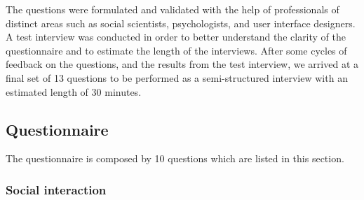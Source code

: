 \documentclass{sigchi}
\begin{document}
The questions were formulated and validated with the help of professionals of distinct areas such as social scientists, psychologists, and user interface designers.  A test interview was conducted in order to better understand the clarity of the questionnaire and to estimate the length of the interviews. After some cycles of feedback on the questions, and the results from the test interview, we arrived at a final set of 13 questions to be performed as a semi-structured interview with an estimated length of 30 minutes. 

\subsection{Questionnaire}
The questionnaire is composed by 10 questions which are listed in this section.

\subsubsection{Social interaction}
\end{document}
